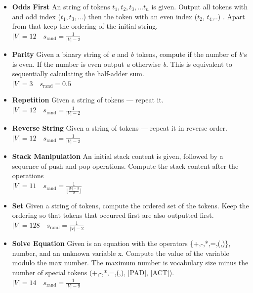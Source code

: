 \documentclass[dvipsnames]{article}
\begin{document}
\begin{appendix}
\begin{itemize}
    \item\textbf{Odds First}
    An string of tokens $t_1, t_2, t_3, ...t_n$ is given. Output all tokens with and odd index ($t_1,t_3,...$) then the token with an even index ($t_2$, $t_4$,..) . Apart from that keep the ordering of the initial string. \\
    $|V|=12 \quad s_{\text{rand}}=\frac{1}{|V| - 2}$
    
    \item\textbf{Parity}
    Given a binary string of \textit{a} and \textit{b} tokens, compute if the number of \textit{b}`s is even. If the number is even output \textit{a} otherwise \textit{b}. This is equivalent to sequentially calculating the half-adder sum. \\
    $|V|=3 \quad s_{\text{rand}}=0.5$    

    \item\textbf{Repetition}
    Given a string of tokens --- repeat it. \\
    $|V|=12 \quad s_{\text{rand}}=\frac{1}{|V| - 2}$

    \item\textbf{Reverse String}
    Given a string of tokens --- repeat it in reverse order. \\
    $|V|=12 \quad s_{\text{rand}}=\frac{1}{|V| - 2}$

    \item\textbf{Stack Manipulation}
    An initial stack content is given, followed by a sequence of push and pop operations. Compute the stack content after the operations \\
    $|V|=11 \quad s_{\text{rand}}=\frac{1}{\lfloor\frac{|V| - 3}{2}\rfloor}$

    \item\textbf{Set}
    Given a string of tokens, compute the ordered set of the tokens. Keep the ordering so that tokens that occurred first are also outputted first. \\
    $|V|=128 \quad s_{\text{rand}}=\frac{1}{|V| - 2}$

    \item\textbf{Solve Equation}
    Given is an equation with the operators \{+,-,*,=,(,)\}, number, and an unknown variable x. Compute the value of the variable modulo the max number. The maximum number is vocabulary size minus the number of special tokens (+,-,*,=,(,), [PAD], [ACT]). \\
    $|V|=14 \quad s_{\text{rand}}=\frac{1}{|V|-9}$
\end{itemize}


\end{appendix}
\end{document}
